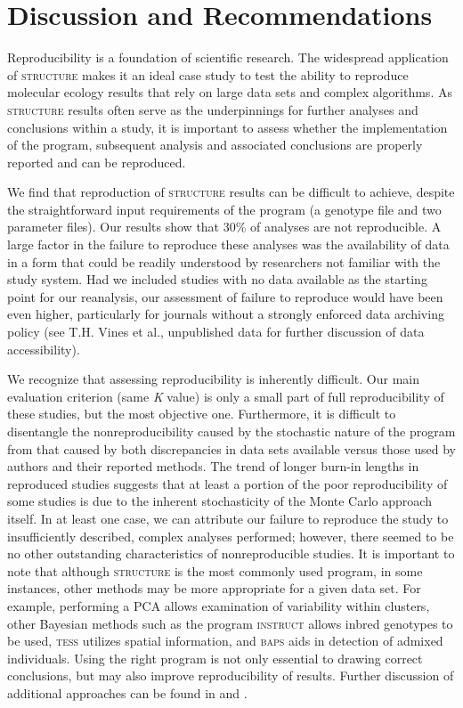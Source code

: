 \section{Discussion and Recommendations}
Reproducibility is a foundation of scientific research. The widespread application of \textsc{structure} 
makes it an ideal case study to test the ability to reproduce molecular ecology results that rely on large 
data sets and complex algorithms. As \textsc{structure} results often serve as the underpinnings for 
further analyses and conclusions within a study, it is important to assess whether the implementation 
of the program, subsequent analysis and associated conclusions are properly reported and can be reproduced.

We find that reproduction of \textsc{structure} results can be difficult to achieve, despite the 
straightforward input requirements of the program (a genotype file and two parameter files). Our 
results show that 30\% of analyses are not reproducible. A large factor in the failure to reproduce 
these analyses was the availability of data in a form that could be readily understood by researchers 
not familiar with the study system. Had we included studies with no data available as the starting 
point for our reanalysis, our assessment of failure to reproduce would have been even higher, particularly 
for journals without a strongly enforced data archiving policy (see T.H. Vines et al., unpublished data 
for further discussion of data accessibility).

We recognize that assessing reproducibility is inherently difficult. Our main evaluation criterion 
(same \emph{K} value) is only a small part of full reproducibility of these studies, but the most 
objective one. Furthermore, it is difficult to disentangle the nonreproducibility caused by the 
stochastic nature of the program from that caused by both discrepancies in data sets available versus 
those used by authors and their reported methods. The trend of longer burn-in lengths in reproduced 
studies suggests that at least a portion of the poor reproducibility of some studies is due to the 
inherent stochasticity of the Monte Carlo approach itself. In at least one case, we can attribute 
our failure to reproduce the study to insufficiently described, complex analyses performed; however, 
there seemed to be no other outstanding characteristics of nonreproducible studies. It is important 
to note that although \textsc{structure} is the most commonly used program, in some instances, other methods
may be more appropriate for a given data set. For example, performing a PCA allows examination of 
variability within clusters, other Bayesian methods such as the program \textsc{instruct} \citep{Gao-etal:2007} 
allows inbred genotypes to be used, \textsc{tess} \citep{Chen:2007} utilizes spatial information, 
and \textsc{baps} \citep{Corander:2003, Corander:2004, Corander:2006, CoranderMarttinen:2006} aids in detection 
of admixed individuals. Using the right program is not only essential to drawing correct conclusions, 
but may also improve reproducibility of results. Further discussion of additional approaches can be 
found in \citet{Latch:2006} and \citet{Franccois:2010}.

